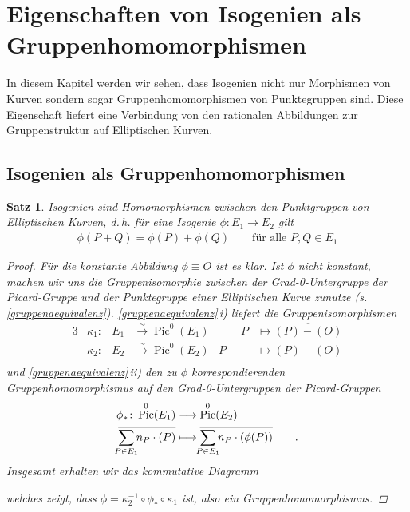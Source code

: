 \documentclass[english, german, parskip=half]{scrartcl}
\newtheorem{Satz}{Satz}[section]
\theoremstyle{definition}
\theoremstyle{remark}
\newcommand*{\longto}{\longrightarrow}
\DeclareMathOperator{\Pic}{Pic} %
\renewcommand{\O}{O}
\begin{document}

\section%
{Eigenschaften von Isogenien als Gruppenhomomorphismen}
In diesem Kapitel werden wir sehen, dass Isogenien nicht nur
Morphismen von Kurven sondern sogar Gruppenhomomorphismen von
Punktegruppen sind.
Diese Eigenschaft liefert eine Verbindung von den 
rationalen Abbildungen zur Gruppenstruktur auf Elliptischen
Kurven.

\subsection{Isogenien als Gruppenhomomorphismen}
\begin{Satz}\label{isogenienhoms}
  Isogenien sind Homomorphismen zwischen den Punktgruppen von
  Elliptischen Kurven, d.\,h. für eine Isogenie $\phi\colon E_1\to
  E_2$ gilt
  \begin{gather*}
    \phi(P+Q) = \phi(P) + \phi(Q)
    \qquad \text{für alle } P,Q\in E_1
  \end{gather*}
\begin{proof}
  Für die konstante Abbildung $\phi\equiv \O$ ist es klar.
  Ist $\phi$ nicht konstant, machen wir uns die Gruppenisomorphie
  zwischen der Grad-0-Untergruppe der Picard-Gruppe und der
  Punktegruppe einer Elliptischen Kurve zunutze
  (s.\,\autoref{gruppenaequivalenz}).
  \autoref{gruppenaequivalenz}\,i) liefert die Gruppenisomorphismen 
  \begin{alignat*}{3}
    &\kappa_1\colon&
    E_1&\overset\sim\longto \Pic^0(E_1)
    &\qquad P &\longmapsto \overline{(P)-(\O)}\\
    &\kappa_2\colon&
    E_2&\overset\sim\longto \Pic^0(E_2)
    &P &\longmapsto \overline{(P)-(\O)}\\
  \end{alignat*}
  und \autoref{gruppenaequivalenz}\,ii) den zu $\phi$
  korrespondierenden Gruppenhomomorphismus auf den Grad-0-Untergruppen
  der Picard-Gruppen
  \begin{align*}
    \phi_*\colon \Pic^0(E_1) 
    &\longto \Pic^0(E_2)\\
    \overline{\sum_{\mathclap{P\in E_1}}n_P\cdot(P)}
    &\longmapsto 
      \overline{\sum_{\mathclap{P\in E_1}}n_P\cdot(\phi(P))}
      \qquad .
  \end{align*}
  Insgesamt erhalten wir das kommutative Diagramm
  \begin{center}
  \end{center}
  welches zeigt, dass $\phi=\kappa_2^{-1}\circ\phi_*\circ\kappa_1$
  ist, also ein Gruppenhomomorphismus.
\end{proof}
\end{Satz}
\end{document}
